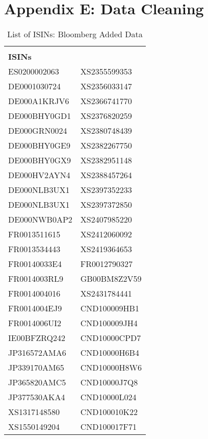 %
%

\chapter{Appendix E: Data Cleaning}
\label{appE}

\begin{table}[H]
\centering
\footnotesize
\caption{List of ISINs: Bloomberg Added Data}
\begin{tabular}{ll}
\\[-1.8ex]\hline 
\hline \\[-1.8ex] 
\textbf{ISINs} &  \\ \hline
{ES0200002063} & {XS2355599353} \\
{DE0001030724} & {XS2356033147} \\
{DE000A1KRJV6} & {XS2366741770} \\
{DE000BHY0GD1} & {XS2376820259} \\
{DE000GRN0024} & {XS2380748439} \\
{DE000BHY0GE9} & {XS2382267750} \\
{DE000BHY0GX9} & {XS2382951148} \\
{DE000HV2AYN4} & {XS2388457264} \\
{DE000NLB3UX1} & {XS2397352233} \\
{DE000NLB3UX1} & {XS2397372850} \\
{DE000NWB0AP2} & {XS2407985220} \\
{FR0013511615} & {XS2412060092} \\
{FR0013534443} & {XS2419364653} \\
{FR00140033E4} & {FR0012790327} \\
{FR0014003RL9} & {GB00BM8Z2V59} \\
{FR0014004016} & {XS2431784441} \\
{FR0014004EJ9} & {CND100009HB1} \\
{FR0014006UI2} & {CND100009JH4} \\
{IE00BFZRQ242} & {CND10000CPD7} \\
{JP316572AMA6} & {CND10000H6B4} \\
{JP339170AM65} & {CND10000H8W6} \\
{JP365820AMC5} & {CND10000J7Q8} \\
{JP377530AKA4} & {CND10000L024} \\
{XS1317148580} & {CND100010K22} \\
{XS1550149204} & {CND100017F71} \\

\end{tabular}
\end{table}
